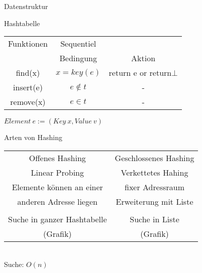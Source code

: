 \documentclass[aspectratio=169]{beamer}
\begin{document}
\begin{frame}[t]{Datenstruktur }	
	\center

	
	Hashtabelle
	\pause
	\vfill
   	\begin{tabular}[h]{c|c c}
		\hline
		Funktionen 			&Sequentiel& \\
						& Bedingung & Aktion \\
		\hline
		find(x)      			& $x = key(e)  $	& return e or return$\bot$   \\
		insert(e)			& $e \not \in t$ 	& -  \\
		remove(x)			& $e \in t$		& -  \\

		\hline
	\end{tabular}
	\vfill
	\pause
   	$Element \: e :=(Key \: x ,Value \: v)$
	 
\end{frame}
\begin{frame}[t]{Arten von Hashing}
	\center
	\begin{tabular}[h]{c |c}
		Offenes Hashing		 	&	 Geschlossenes Hashing \\
		Linear Probing			&	 Verkettetes Hahing   \\
		\hline
		\pause
		Elemente können an einer	 	&	fixer Adressraum \\
		anderen Adresse liegen		&	Erweiterung mit Liste\\
		\pause
							\\
		Suche in ganzer Hashtabelle	&	Suche in Liste \\
		(Grafik)				& 	(Grafik)
		
	\end{tabular}
	 
	 \hfil
	 \pause
	 \\
		Suche: $O(n)$
	
 
\end{frame}
\end{document}
